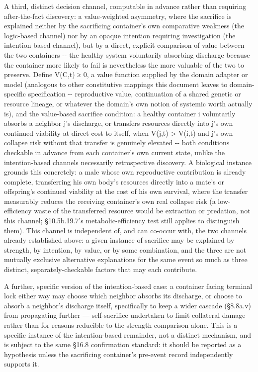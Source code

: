\documentclass[
]{article}
\begin{document}
A third, distinct decision channel, computable in advance rather than
requiring after-the-fact discovery: a value-weighted asymmetry, where
the sacrifice is explained neither by the sacrificing container's own
comparative weakness (the logic-based channel) nor by an opaque
intention requiring investigation (the intention-based channel), but by
a direct, explicit comparison of value between the two containers -\/-
the healthy system voluntarily absorbing discharge because the container
more likely to fail is nevertheless the more valuable of the two to
preserve. Define V(C,t) ≥ 0, a value function supplied by the domain
adapter or model (analogous to other constitutive mappings this document
leaves to domain-specific specification -\/- reproductive value,
continuation of a shared genetic or resource lineage, or whatever the
domain's own notion of systemic worth actually is), and the value-based
sacrifice condition: a healthy container i voluntarily absorbs a
neighbor j's discharge, or transfers resources directly into j's own
continued viability at direct cost to itself, when V(j,t) \textgreater{}
V(i,t) and j's own collapse risk without that transfer is genuinely
elevated -\/- both conditions checkable in advance from each container's
own current state, unlike the intention-based channels necessarily
retrospective discovery. A biological instance grounds this concretely:
a male whose own reproductive contribution is already complete,
transferring his own body's resources directly into a mate's or offspring's
continued viability at the cost of his own survival, where the transfer
measurably reduces the receiving container's own real collapse risk (a
low-efficiency waste of the transferred resource would be extraction or
predation, not this channel; §10.5b.19.7's metabolic-efficiency test
still applies to distinguish them). This channel is independent of, and
can co-occur with, the two channels already established above: a given
instance of sacrifice may be explained by strength, by intention, by
value, or by some combination, and the three are not mutually exclusive
alternative explanations for the same event so much as three distinct,
separately-checkable factors that may each contribute.

A further, specific version of the intention-based case: a container
facing terminal lock either way may choose which neighbor absorbs its
discharge, or choose to absorb a neighbor's discharge itself,
specifically to keep a wider cascade (§8.8a.v) from propagating further
--- self-sacrifice undertaken to limit collateral damage rather than for
reasons reducible to the strength comparison alone. This is a specific
instance of the intention-based remainder, not a distinct mechanism, and
is subject to the same §16.8 confirmation standard: it should be
reported as a hypothesis unless the sacrificing container's pre-event
record independently supports it.
\end{document}
